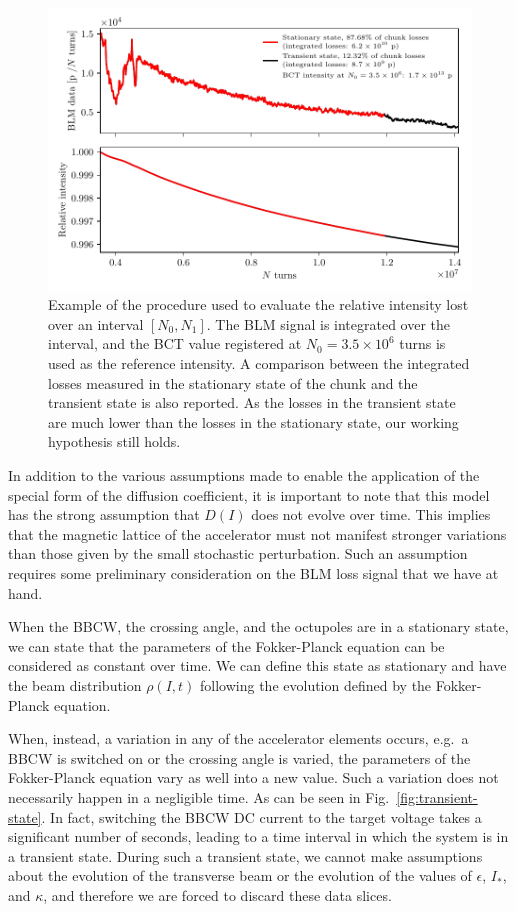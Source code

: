 \begin{figure}[hpt]
    \centering
    \includegraphics[width=1.0\textwidth]{5_wire_compensators_LHC/figs/stationary_transient_example_chunk.pdf}
    \caption{Example of the procedure used to evaluate the relative intensity lost over an interval $[N_0, N_1]$. The BLM signal is integrated over the interval, and the BCT value registered at $N_0=3.5\times10^6$ turns is used as the reference intensity. A comparison between the integrated losses measured in the stationary state of the chunk and the transient state is also reported. As the losses in the transient state are much lower than the losses in the stationary state, our working hypothesis still holds.}
    \label{fig:blm-to-intensity}
\end{figure}

In addition to the various assumptions made to enable the application of the special form of the diffusion coefficient, it is important to note that this model has the strong assumption that $D(I)$ does not evolve over time. This implies that the magnetic lattice of the accelerator must not manifest stronger variations than those given by the small stochastic perturbation. Such an assumption requires some preliminary consideration on the BLM loss signal that we have at hand.

When the BBCW, the crossing angle, and the octupoles are in a stationary state, we can state that the parameters of the Fokker-Planck equation can be considered as constant over time. We can define this state as stationary and have the beam distribution $\rho(I, t)$ following the evolution defined by the Fokker-Planck equation.

When, instead, a variation in any of the accelerator elements occurs, e.g.\ a BBCW is switched on or the crossing angle is varied, the parameters of the Fokker-Planck equation vary as well into a new value. Such a variation does not necessarily happen in a negligible time. As can be seen in Fig.~\ref{fig:transient-state}. In fact, switching the BBCW DC current to the target voltage takes a significant number of seconds, leading to a time interval in which the system is in a transient state. During such a transient state, we cannot make assumptions about the evolution of the transverse beam or the evolution of the values of $\epsilon$, $I_\ast$, and $\kappa$, and therefore we are forced to discard these data slices.

